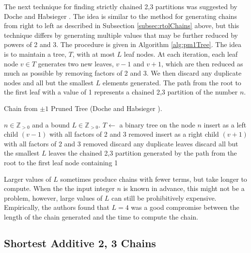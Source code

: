 \documentclass{ucalgthes1}
\theoremstyle{definition}
\newcommand{\ZZgtz}{\mathbb{Z}_{>0}}
\begin{document}
The next technique for finding strictly chained 2,3 partitions was suggested by Doche and Habsieger \cite{Doche2008}. The idea is similar to the method for generating chains from right to left as described in Subsection \ref{subsec:rtolChains} above, but this technique differs by generating multiple values that may be further reduced by powers of 2 and 3. The procedure is given in Algorithm \ref{alg:pm1Tree}.  The idea is to maintain a tree, $T$, with at most $L$ leaf nodes. At each iteration, each leaf node $v \in T$ generates two new leaves, $v-1$ and $v+1$, which are then reduced as much as possible by removing factors of 2 and 3.  We then discard any duplicate nodes and all but the smallest $L$ elements generated. The path from the root to the first leaf with a value of 1 represents a chained 2,3 partition of the number $n$.

\begin{algorithm}[htb]
\caption{Chain from $\pm 1$ Pruned Tree (Doche and Habsieger \cite{Doche2008}).}
\label{alg:pm1Tree}
\begin{algorithmic}[1]
\Require $n \in \ZZgtz$ and a bound $L \in \ZZgtz$.
\State $T \gets$ a binary tree on the node $n$
		\State insert as a left child $(v - 1)$ with all factors of 2 and 3 removed
		\State insert as a right child $(v + 1)$ with all factors of 2 and 3 removed
	\EndFor
	\State discard any duplicate leaves
	\State discard all but the smallest $L$ leaves
\EndWhile
\State \Return the chained 2,3 partition generated by the path from the root to the first leaf node containing 1
\end{algorithmic}
\end{algorithm}

Larger values of $L$ sometimes produce chains with fewer terms, but take longer to compute.  When the the input integer $n$ is known in advance, this might not be a problem, however, large values of $L$ can still be prohibitively expensive.  Empirically, the authors found that $L=4$ was a good compromise between the length of the chain generated and the time to compute the chain. 


\subsection{Shortest Additive 2, 3 Chains}
\label{subsec:shortAddChains}
\end{document}
